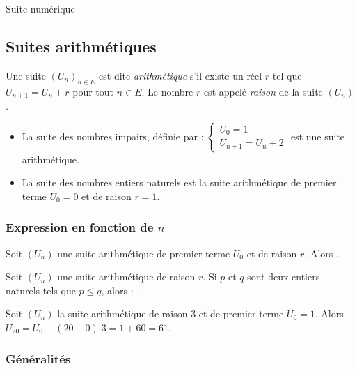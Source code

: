 \begin{chapter}{Suite num\'erique}
\subsection{Suites arithm\'etiques}
\begin{defi}
Une suite $(U_n)_{n \in E}$ est dite \emph{arithm\'etique} s'il existe un r\'eel $r$ tel que $U_{n+1} = U_n + r$ pour tout $n \in E$.
Le nombre $r$ est appel\'e \emph{raison} de la suite $(U_n)$.
\end{defi}
\begin{ex}
\begin{itemize} 
\item 
La suite des nombres impairs, d\'efinie par : 
$
\left\lbrace
\begin{array}{l}
U_0 = 1 \\
U_{n+1} = U_n + 2
\end{array}
\right.
$
est une suite arithm\'etique.
\item 
La suite des nombres entiers naturels est la suite arithm\'etique de premier terme $U_0 = 0$ et de raison $r = 1$.
\end{itemize}
\end{ex}
%
\subsubsection{Expression en fonction de $n$}
Soit $(U_n)$ une suite arithm\'etique de premier terme $U_0$ et de raison $r$. Alors 
.
\begin{prop}
Soit $(U_n)$ une suite arithm\'etique de raison $r$.
Si $p$ et $q$ sont deux entiers naturels tels que $p \leq q$, alors : .
\end{prop}
%
\begin{ex}
Soit $(U_n)$ la suite arithm\'etique de raison $3$ et de premier terme $U_0 = 1$.
Alors $U_{20} = U_0 + (20 - 0) \; 3 = 1 + 60 = 61$.
\end{ex}
%
\subsubsection{G\'en\'eralit\'es}
%

\end{chapter}
